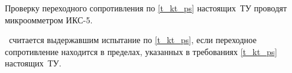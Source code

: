 Проверку переходного сопротивления по \ref{t_kt_ps} настоящих~ТУ проводят микроомметром ИКС-5.

\dut \ считается выдержавшим испытание по \ref{t_kt_ps}, если переходное сопротивление находится в пределах, указанных в требованиях \ref{t_kt_ps} настоящих~ТУ.